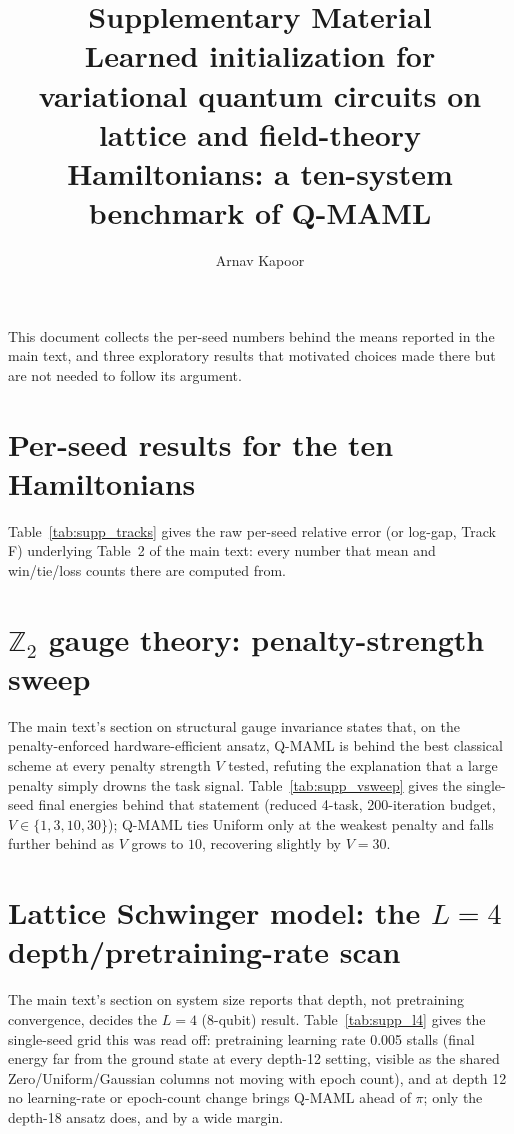 \documentclass[11pt]{article}
\title{Supplementary Material\\
\large Learned initialization for variational quantum circuits on lattice and field-theory Hamiltonians: a ten-system benchmark of Q-MAML}
\author{Arnav Kapoor}
\date{}
\begin{document}
\maketitle

This document collects the per-seed numbers behind the means reported in the main text, and three
exploratory results that motivated choices made there but are not needed to follow its argument.

\section{Per-seed results for the ten Hamiltonians}\label{sec:supp_tracks}

Table~\ref{tab:supp_tracks} gives the raw per-seed relative error (or log-gap, Track F) underlying
Table~2 of the main text: every number that mean and win/tie/loss counts there are computed from.



\section{$\mathbb{Z}_2$ gauge theory: penalty-strength sweep}\label{sec:supp_vsweep}

The main text's section on structural gauge invariance states that, on the penalty-enforced
hardware-efficient ansatz, Q-MAML is behind the best classical scheme at every penalty strength $V$
tested, refuting the explanation that a large penalty simply drowns the task signal.
Table~\ref{tab:supp_vsweep} gives the single-seed final energies behind that statement (reduced
4-task, 200-iteration budget, $V\in\{1,3,10,30\}$); Q-MAML ties Uniform only at the weakest penalty
and falls further behind as $V$ grows to $10$, recovering slightly by $V=30$.



\section{Lattice Schwinger model: the $L{=}4$ depth/pretraining-rate scan}\label{sec:supp_l4}

The main text's section on system size reports that depth, not pretraining convergence, decides the
$L{=}4$ (8-qubit) result. Table~\ref{tab:supp_l4} gives the single-seed grid this was read off:
pretraining learning rate 0.005 stalls (final energy far from the ground state at every depth-12
setting, visible as the shared Zero/Uniform/Gaussian columns not moving with epoch count), and at
depth 12 no learning-rate or epoch-count change brings Q-MAML ahead of $\pi$; only the depth-18
ansatz does, and by a wide margin.
\end{document}
